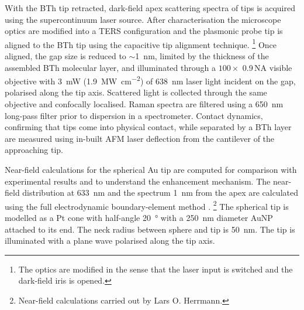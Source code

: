 \documentclass{article}
\begin{document}
With the BTh tip retracted, dark-field apex scattering spectra of tips is acquired using the supercontinuum laser source. After characterisation the microscope optics are modified into a TERS configuration and the plasmonic probe tip is aligned to the BTh tip using the capacitive tip alignment technique.%
\footnote{The optics are modified in the sense that the laser input is switched and the dark-field iris is opened.}
Once aligned, the gap size is reduced to  $\sim$\SI{1}{nm}, limited by the thickness of the assembled BTh molecular layer, and illuminated through a $100\times$ 0.9\,NA visible objective with \SI{3}{mW} (\SI{1.9}{\mega\watt\per\centi\metre\squared}) of \SI{638}{nm} laser light incident on the gap,  polarised along the tip axis. Scattered light is collected through the same objective and confocally localised. Raman spectra are filtered using a \SI{650}{nm} long-pass filter prior to dispersion in a spectrometer. Contact dynamics, confirming that tips come into physical contact, while separated by a BTh layer are measured using in-built AFM laser deflection from the cantilever of the approaching tip.

Near-field calculations for the spherical Au tip are computed for comparison with experimental results and to understand the enhancement mechanism. The near-field distribution at \SI{633}{nm} and the spectrum \SI{1}{nm} from the apex are calculated using the full electrodynamic boundary-element method \cite{deabajo1997, deabajo2002}.%
\footnote{Near-field calculations carried out by Lars O. Herrmann.}
The spherical tip is modelled as a Pt cone with half-angle \SI{20}{\degree} with a \SI{250}{nm} diameter AuNP attached to its end. The neck radius between sphere and tip is \SI{50}{nm}. The tip is illuminated with a plane wave polarised along the tip axis.
\end{document}
